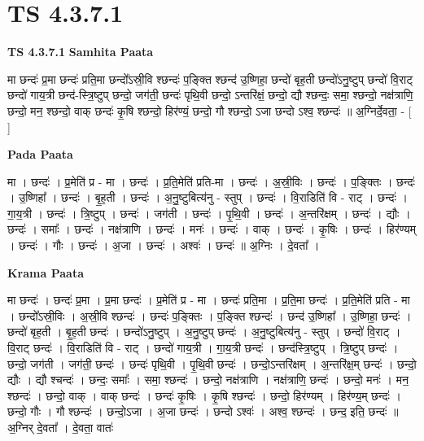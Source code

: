 \documentclass[17pt]{extarticle}
\begin{document}
\section{ TS 4.3.7.1 }

\textbf{TS 4.3.7.1 } \newline
\textbf{Samhita Paata} \newline

मा छन्दः॑ प्र॒मा छन्दः॑ प्रति॒मा छन्दो᳚ऽस्री॒वि श्छन्दः॑ प॒ङ्क्ति श्छन्द॑ उ॒ष्णिहा॒ छन्दो॑ बृह॒ती छन्दो॑ऽनु॒ष्टुप् छन्दो॑ वि॒राट् छन्दो॑ गाय॒त्री छन्द॑-स्त्रि॒ष्टुप् छन्दो॒ जग॑ती॒ छन्दः॑ पृथि॒वी छन्दो॒ ऽन्तरि॑क्षं॒ छन्दो॒ द्यौ श्छन्दः॒ समा॒ श्छन्दो॒ नक्ष॑त्राणि॒ छन्दो॒ मन॒ श्छन्दो॒ वाक् छन्दः॑ कृ॒षि श्छन्दो॒ हिर॑ण्यं॒ छन्दो॒ गौ श्छन्दो॒ ऽजा छन्दो ऽश्व॒ श्छन्दः॑ ॥ अ॒ग्निर्दे॒वता॒ - [  ] \newline

\textbf{Pada Paata} \newline

मा । छन्दः॑ । प्र॒मेति॑ प्र - मा । छन्दः॑ । प्र॒ति॒मेति॑ प्रति-मा । छन्दः॑ । अ॒स्री॒विः । छन्दः॑ । प॒ङ्क्तिः । छन्दः॑ । उ॒ष्णिहा᳚ । छन्दः॑ । बृ॒ह॒ती । छन्दः॑ । अ॒नु॒ष्टुबित्य॑नु - स्तुप् । छन्दः॑ । वि॒राडिति॑ वि - राट् । छन्दः॑ । गा॒य॒त्री । छन्दः॑ । त्रि॒ष्टुप् । छन्दः॑ । जग॑ती । छन्दः॑ । पृ॒थि॒वी । छन्दः॑ । अ॒न्तरि॑क्षम् । छन्दः॑ । द्यौः । छन्दः॑ । समाः᳚ । छन्दः॑ । नक्ष॑त्राणि । छन्दः॑ । मनः॑ । छन्दः॑ । वाक् । छन्दः॑ । कृ॒षिः । छन्दः॑ । हिर॑ण्यम् । छन्दः॑ । गौः । छन्दः॑ । अ॒जा । छन्दः॑ । अश्वः॑ । छन्दः॑ ॥ अ॒ग्निः । दे॒वता᳚ ।  \newline


\textbf{Krama Paata} \newline

मा छन्दः॑ । छन्दः॑ प्र॒मा । प्र॒मा छन्दः॑ । प्र॒मेति॑ प्र - मा । छन्दः॑ प्रति॒मा । प्र॒ति॒मा छन्दः॑ । प्र॒ति॒मेति॑ प्रति - मा । छन्दो᳚ऽस्री॒विः । अ॒स्री॒वि श्छन्दः॑ । छन्दः॑ प॒ङ्क्तिः । प॒ङ्क्ति श्छन्दः॑ । छन्द॑ उ॒ष्णिहा᳚ । उ॒ष्णिहा॒ छन्दः॑ । छन्दो॑ बृह॒ती । बृ॒ह॒ती छन्दः॑ । छन्दो॑ऽनु॒ष्टुप् । अ॒नु॒ष्टुप् छन्दः॑ । अ॒नु॒ष्टुबित्य॑नु - स्तुप् । छन्दो॑ वि॒राट् । वि॒राट् छन्दः॑ । वि॒राडिति॑ वि - राट् । छन्दो॑ गाय॒त्री । गा॒य॒त्री छन्दः॑ । छन्द॑स्त्रि॒ष्टुप् । त्रि॒ष्टुप् छन्दः॑ । छन्दो॒ जग॑ती । जग॑ती॒ छन्दः॑ । छन्दः॑ पृथि॒वी । पृ॒थि॒वी छन्दः॑ । छन्दो॒ऽन्तरि॑क्षम् । अ॒न्तरि॑क्ष॒म् छन्दः॑ । छन्दो॒ द्यौः । द्यौ श्चन्दः॑ । छन्दः॒ समाः᳚ । समा॒ श्छन्दः॑ । छन्दो॒ नक्ष॑त्राणि । नक्ष॑त्राणि॒ छन्दः॑ । छन्दो॒ मनः॑ । मन॒ श्छन्दः॑ । छन्दो॒ वाक् । वाक् छन्दः॑ । छन्दः॑ कृ॒षिः । कृ॒षि श्छन्दः॑ । छन्दो॒ हिर॑ण्यम् । हिर॑ण्य॒म् छन्दः॑ । छन्दो॒ गौः । गौ श्छन्दः॑ । छन्दो॒ऽजा । अ॒जा छन्दः॑ । छन्दो ऽश्वः॑ । अश्व॒ श्छन्दः॑ । छन्द॒ इति॒ छन्दः॑ ॥ अ॒ग्निर् दे॒वता᳚ । दे॒वता॒ वातः॑ \newline
\end{document}
